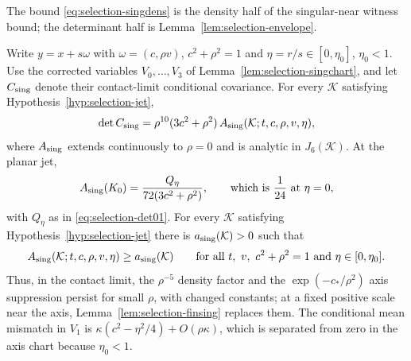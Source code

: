 The bound \eqref{eq:selection-singdens} is the density half of the singular-near witness bound; the determinant half is Lemma~\ref{lem:selection-envelope}.

\begin{lemma}\label{lem:selection-singfactor}
Write $y=x+s\omega$ with $\omega=(c,\rho v)$, $c^2+\rho^2=1$ and $\eta=r/s\in[0,\eta_0]$, $\eta_0<1$. Use the corrected variables $V_0,\dots,V_3$ of Lemma~\ref{lem:selection-singchart}, and let $C_{\rm sing}$ denote their contact-limit conditional covariance. For every $\mathcal K$ satisfying Hypothesis~\ref{hyp:selection-jet},
\begin{equation}\label{eq:selection-singfactor}
\det C_{\rm sing}=\rho^{10}(3c^2+\rho^2)\,A_{\rm sing}(\mathcal K;t,c,\rho,v,\eta),
\end{equation}
where $A_{\rm sing}$ extends continuously to $\rho=0$ and is analytic in $J_6(\mathcal K)$. At the planar jet,
\begin{equation}\label{eq:selection-Asing0}
A_{\rm sing}(K_0)=\frac{Q_\eta}{72(3c^2+\rho^2)},\qquad\text{which is }\frac1{24}\text{ at }\eta=0,
\end{equation}
with $Q_\eta$ as in \eqref{eq:selection-det01}. For every $\mathcal K$ satisfying Hypothesis~\ref{hyp:selection-jet} there is $a_{\rm sing}(\mathcal K)>0$ such that
\begin{equation}\label{eq:selection-Asing}
A_{\rm sing}(\mathcal K;t,c,\rho,v,\eta)\ge a_{\rm sing}(\mathcal K)\qquad\text{for all }t,\ v,\ c^2+\rho^2=1\text{ and }\eta\in[0,\eta_0].
\end{equation}
Thus, in the contact limit, the $\rho^{-5}$ density factor and the $\exp(-c_*/\rho^2)$ axis suppression persist for small $\rho$, with changed constants; at a fixed positive scale near the axis, Lemma~\ref{lem:selection-finsing} replaces them. The conditional mean mismatch in $V_1$ is $\kappa(c^2-\eta^2/4)+O(\rho\kappa)$, which is separated from zero in the axis chart because $\eta_0<1$.
\end{lemma}

